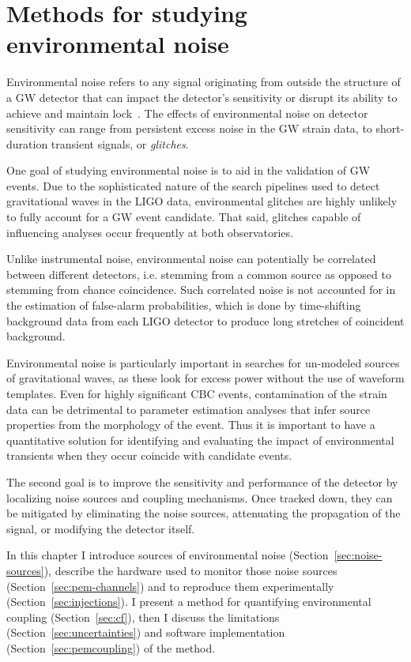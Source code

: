 \chapter{Methods for studying environmental noise}

Environmental noise refers to any signal originating from outside the structure of a \ac{GW} detector that can impact the detector's sensitivity or disrupt its ability to achieve and maintain lock~\citep{Effler_2015,Nguyen_2021}.
The effects of environmental noise on detector sensitivity can range from persistent excess noise in the \ac{GW} strain data, to short-duration transient signals, or \textit{glitches}.

One goal of studying environmental noise is to aid in the validation of \ac{GW} events.
Due to the sophisticated nature of the search pipelines used to detect gravitational waves in the \ac{LIGO} data, environmental glitches are highly unlikely to fully account for a \ac{GW} event candidate.
That said, glitches capable of influencing analyses occur frequently at both observatories.

Unlike instrumental noise, environmental noise can potentially be correlated between different detectors, i.e. stemming from a common source as opposed to stemming from chance coincidence.
Such correlated noise is not accounted for in the estimation of false-alarm probabilities, which is done by time-shifting background data from each \ac{LIGO} detector to produce long stretches of coincident background.

Environmental noise is particularly important in searches for un-modeled sources of gravitational waves, as these look for excess power without the use of waveform templates.
Even for highly significant \ac{CBC} events, contamination of the strain data can be detrimental to parameter estimation analyses that infer source properties from the morphology of the event.
Thus it is important to have a quantitative solution for identifying and evaluating the impact of environmental transients when they occur coincide with candidate events.

The second goal is to improve the sensitivity and performance of the detector by localizing noise sources and coupling mechanisms. Once tracked down, they can be mitigated by eliminating the noise sources, attenuating the propagation of the signal, or modifying the detector itself.

In this chapter I introduce sources of environmental noise (Section~\ref{sec:noise-sources}), describe the hardware used to monitor those noise sources (Section~\ref{sec:pem-channels}) and to reproduce them experimentally (Section~\ref{sec:injections}).
I present a method for quantifying environmental coupling (Section~\ref{sec:cf}), then I discuss the limitations (Section~\ref{sec:uncertainties}) and software implementation (Section~\ref{sec:pemcoupling}) of the method.

